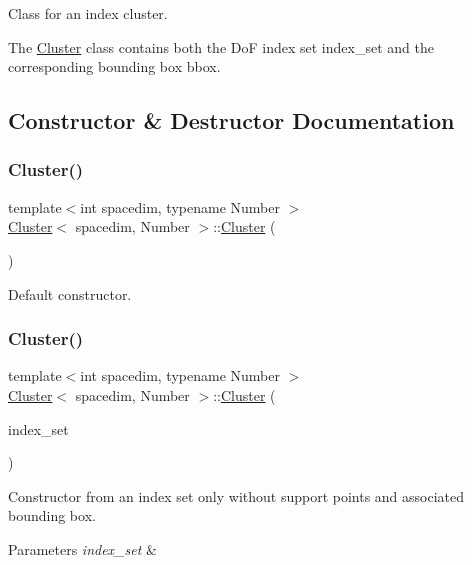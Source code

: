 Class for an index cluster. 

The {\ttfamily \hyperlink{classCluster}{Cluster}} class contains both the DoF index set {\ttfamily index\+\_\+set} and the corresponding bounding box {\ttfamily bbox}. 

\subsection{Constructor \& Destructor Documentation}
\mbox{\label{classCluster_a214163f431f0bd9840d14bbebcc087e7}} 
\subsubsection{\texorpdfstring{Cluster()}{Cluster()}\hspace{0.1cm}{\footnotesize\ttfamily [1/7]}}
{\footnotesize\ttfamily template$<$int spacedim, typename Number $>$ \\
\hyperlink{classCluster}{Cluster}$<$ spacedim, Number $>$\+::\hyperlink{classCluster}{Cluster} (\begin{DoxyParamCaption}{ }\end{DoxyParamCaption})}

Default constructor. \mbox{\label{classCluster_aa87c73e27c410b04415e5ff1b026ae74}} 
\subsubsection{\texorpdfstring{Cluster()}{Cluster()}\hspace{0.1cm}{\footnotesize\ttfamily [2/7]}}
{\footnotesize\ttfamily template$<$int spacedim, typename Number $>$ \\
\hyperlink{classCluster}{Cluster}$<$ spacedim, Number $>$\+::\hyperlink{classCluster}{Cluster} (\begin{DoxyParamCaption}\item[{const std\+::vector$<$ types\+::global\+\_\+dof\+\_\+index $>$ \&}]{index\+\_\+set }\end{DoxyParamCaption})}

Constructor from an index set only without support points and associated bounding box. 
\begin{DoxyParams}{Parameters}
{\em index\+\_\+set} & \\
\hline
\end{DoxyParams}
\mbox{\label{classCluster_a157b06089b0f866a754a8e3a3aa49fd9}} 

